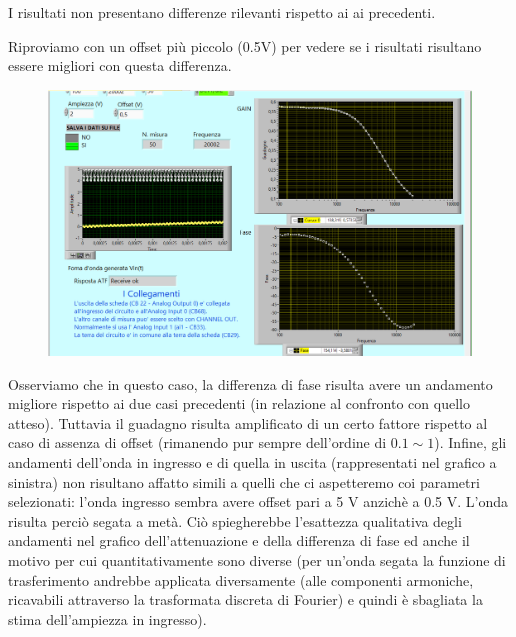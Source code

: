 I risultati non presentano differenze rilevanti rispetto ai ai precedenti. 

Riproviamo con un offset più piccolo (0.5V) per vedere se i risultati risultano essere migliori con questa differenza.

\begin{figure}[H]
\caption{}
    \includegraphics[width=12cm]{settimana_2/immagini/ACQUIS7pomeriggiomartediritagliatax.png}
    \centering
\end{figure}

Osserviamo che in questo caso, la differenza di fase risulta avere un andamento migliore rispetto ai due casi precedenti (in relazione al confronto con quello atteso). Tuttavia il guadagno risulta amplificato di un certo fattore rispetto al caso di assenza di offset (rimanendo pur sempre dell'ordine di $0.1 \sim 1$). Infine, gli andamenti dell'onda in ingresso e di quella in uscita (rappresentati nel grafico a sinistra) non risultano affatto simili a quelli che ci aspetteremo coi parametri selezionati: l'onda ingresso sembra avere offset pari a 5 V anzichè a 0.5 V. L'onda risulta perciò segata a metà. Ciò spiegherebbe l'esattezza qualitativa degli andamenti nel grafico dell'attenuazione e della differenza di fase ed anche il motivo per cui quantitativamente sono diverse (per un'onda segata la funzione di trasferimento andrebbe applicata diversamente (alle componenti armoniche, ricavabili attraverso la trasformata discreta di Fourier) e quindi è sbagliata la stima dell'ampiezza in ingresso).


